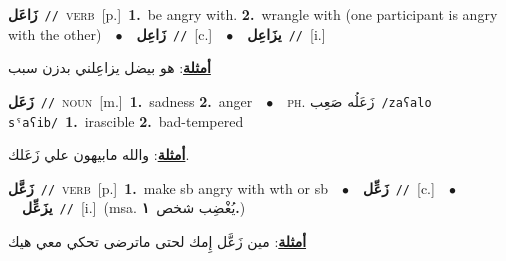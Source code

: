 \documentclass[10pt,a4paper,twoside]{article} %
\begin{document}
\begin{multicols}{2}
{\setlength\topsep{0pt}\textbf{\foreignlanguage{arabic}{زَاعَل}}\ {\color{gray}\texttt{//}\color{black}}\ \textsc{verb}\ [p.]\ \textbf{1.}~be angry with.  \textbf{2.}~wrangle with (one participant is angry with the other)\ \ $\bullet$\ \ \setlength\topsep{0pt}\textbf{\foreignlanguage{arabic}{زَاعِل}}\ {\color{gray}\texttt{//}\color{black}}\ [c.]\ \ $\bullet$\ \ \setlength\topsep{0pt}\textbf{\foreignlanguage{arabic}{يزَاعِل}}\ {\color{gray}\texttt{//}\color{black}}\ [i.]\  \begin{flushright}\color{gray}\foreignlanguage{arabic}{\textbf{\underline{\foreignlanguage{arabic}{أمثلة}}}: هو بيضل يزاعِلني بدزن سبب}\end{flushright}\color{black}} \vspace{2mm}

{\setlength\topsep{0pt}\textbf{\foreignlanguage{arabic}{زَعَل}}\ {\color{gray}\texttt{//}\color{black}}\ \textsc{noun}\ [m.]\ \textbf{1.}~sadness  \textbf{2.}~anger\ \ $\bullet$\ \ \textsc{ph.} \color{gray} \foreignlanguage{arabic}{زَعَلُه صَعِب}\color{black}\ {\color{gray}\texttt{/{\sffamily zaʕalo sˤaʕib}/}\color{black}}\ \textbf{1.}~irascible  \textbf{2.}~bad-tempered\  \begin{flushright}\color{gray}\foreignlanguage{arabic}{\textbf{\underline{\foreignlanguage{arabic}{أمثلة}}}: والله مابيهون علي زَعَلك.}\end{flushright}\color{black}} \vspace{2mm}

{\setlength\topsep{0pt}\textbf{\foreignlanguage{arabic}{زَعَّل}}\ {\color{gray}\texttt{//}\color{black}}\ \textsc{verb}\ [p.]\ \textbf{1.}~make sb angry with wth or sb\ \ $\bullet$\ \ \setlength\topsep{0pt}\textbf{\foreignlanguage{arabic}{زَعِّل}}\ {\color{gray}\texttt{//}\color{black}}\ [c.]\ \ $\bullet$\ \ \setlength\topsep{0pt}\textbf{\foreignlanguage{arabic}{يزَعِّل}}\ {\color{gray}\texttt{//}\color{black}}\ [i.]\ \color{gray}(msa. \foreignlanguage{arabic}{يُغْضِب شخص}~\foreignlanguage{arabic}{\textbf{١.}})\color{black}\  \begin{flushright}\color{gray}\foreignlanguage{arabic}{\textbf{\underline{\foreignlanguage{arabic}{أمثلة}}}: مين زَعَّل إِمك لحتى ماترضى تحكي معي هيك}\end{flushright}\color{black}} \vspace{2mm}


\end{multicols}
\end{document}
